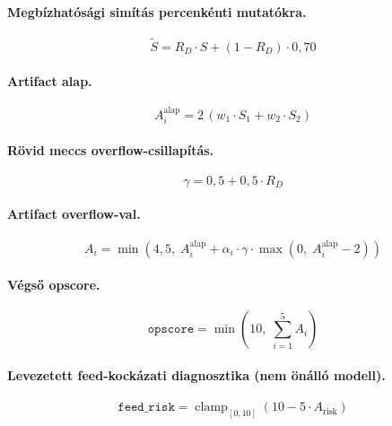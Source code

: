 ﻿\documentclass[a4paper,12pt]{report}
\begin{document}
\paragraph{Megbízhatósági simítás percenkénti mutatókra.}
\begin{equation}
\tilde{S} = R_D \cdot S + (1 - R_D) \cdot 0{,}70
\end{equation}

\paragraph{Artifact alap.}
\begin{equation}
A_i^{\text{alap}} = 2\,(w_1 \cdot S_1 + w_2 \cdot S_2)
\end{equation}

\paragraph{Rövid meccs overflow-csillapítás.}
\begin{equation}
\gamma = 0{,}5 + 0{,}5 \cdot R_D
\end{equation}

\paragraph{Artifact overflow-val.}
\begin{equation}
A_i = \min\!\left(4{,}5,\; A_i^{\text{alap}} + \alpha_i \cdot \gamma \cdot \max\!\left(0,\; A_i^{\text{alap}} - 2\right)\right)
\end{equation}

\paragraph{Végső opscore.}
\begin{equation}
\texttt{opscore} = \min\!\left(10,\; \sum_{i=1}^{5} A_i\right)
\end{equation}

\paragraph{Levezetett feed-kockázati diagnosztika (nem önálló modell).}
\begin{equation}
\texttt{feed\_risk} = \operatorname{clamp}_{[0,10]}\!\left(10 - 5 \cdot A_{\text{risk}}\right)
\end{equation}

\end{document}

